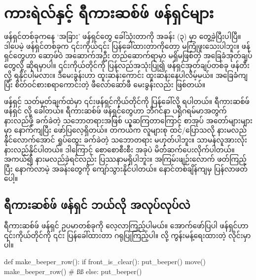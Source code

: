 \chapter{ကားရဲလ်နှင့် ရီကားဆစ်ဖ် ဖန်ရှင်များ}

ဖန်ရှင်တစ်ခုကနေ ‘အခြား’ ဖန်ရှင်တွေ ခေါ်သုံးတာကို အခန်း (၃) မှာ တွေ့ခဲ့ပြီးပါပြီ။ ဒါပေမဲ့ ဖန်ရှင်တစ်ခုက ၎င်းကိုယ်၎င်း ပြန်ခေါ်ထားတာကိုတော့ မကြုံဖူးသေးပါဘူး။ ဖန်ရှင်တွေဟာ ဆော့ဖ်ဝဲ အဆောက်အဦး တည်ဆောက်ရာမှာ မရှိမဖြစ်တဲ့ အခြေခံအုတ်ချပ်တွေလို့ ဆိုရမှာပါ။  ၎င်းကိုယ်တိုင်ကို ပြန်လည်အသုံးပြု၍ ဖန်ရှင်အုတ်ချပ်တစ်ခု ဖန်တီးလို့ ရနိုင်ပါမလား။ ဒီမေးခွန်းဟာ  ထူးဆန်းကောင်း ထူးဆန်းနေပါလိမ့်မယ်။ အခြေခံကျပြီး စိတ်ဝင်စားစရာကောင်းတဲ့ ဖီလော်ဆော်ဖီ မေးခွန်းလည်း ဖြစ်တယ်။



ဖန်ရှင် သတ်မှတ်ချက်ထဲမှာ ၎င်းဖန်ရှင်ကိုယ်တိုင်ကို ပြန်ခေါ်လို့ ရပါတယ်။ ရီကားဆစ်ဖ် ဖန်ရှင်  လို့ ခေါ်တယ်။ ရီကားဆစ်ဖ် ဖန်ရှင်တွေဟာ ဘီဂင်နာ ပရိုဂရမ်မာအတွက် နားလည်ဖို့ ခက်ခဲတဲ့ သဘောတရားအဖြစ် ယူဆကြတာကြောင့် စာအုပ် အတော်များများမှာ  နောက်ကျပြီး ဖော်ပြလေ့ရှိတယ်။ တကယ်က လူများစု ထင်/ပြောသလို နားမလည်နိုင်လောက်အောင် ရှုပ်ထွေး ခက်ခဲတဲ့ သဘောတရား မဟုတ်ပါဘူး။ သာမန်လူအားလုံး နားလည်နိုင်ပါတယ်။ ဒါကြောင့် စောစောစီးစီး အခုပဲ မိတ်ဆက်ပေးလိုက်ပါတယ်။ အကယ်၍ နားမလည်ခဲ့ရင်လည်း ပြဿနာမရှိပါဘူး။ အကြမ်းဖျဉ်းလောက် ဖတ်ကြည့်ပြီး နောက်လာမဲ့ အခန်းတွေကို ကျော်သွားနိုင်ပါတယ်။ နောင်တစ်ချိန်ကျမှ ပြန်လာဖတ်ပေါ့။

\section{ရီကားဆစ်ဖ် ဖန်ရှင် ဘယ်လို အလုပ်လုပ်လဲ}
 ရီကားဆစ်ဖ် ဖန်ရှင် ဥပမာတစ်ခုကို လေ့လာကြည့်ပါမယ်။ အောက်ဖော်ပြပါ ဖန်ရှင်ဟာ  ၎င်းကိုယ်တိုင်ကို ၎င်း ပြန်ခေါ်ထားတာ ဂရုပြုကြည့်ပါ။  လို့ ကွန်းမန့်ရေးထားတဲ့ လိုင်းမှာပါ။
%
\begin{py}

def make_beeper_row():
    if front_is_clear():
        put_beeper()
        move()
        make_beeper_row() # ßß
    else:
        put_beeper()
\end{py}
%

